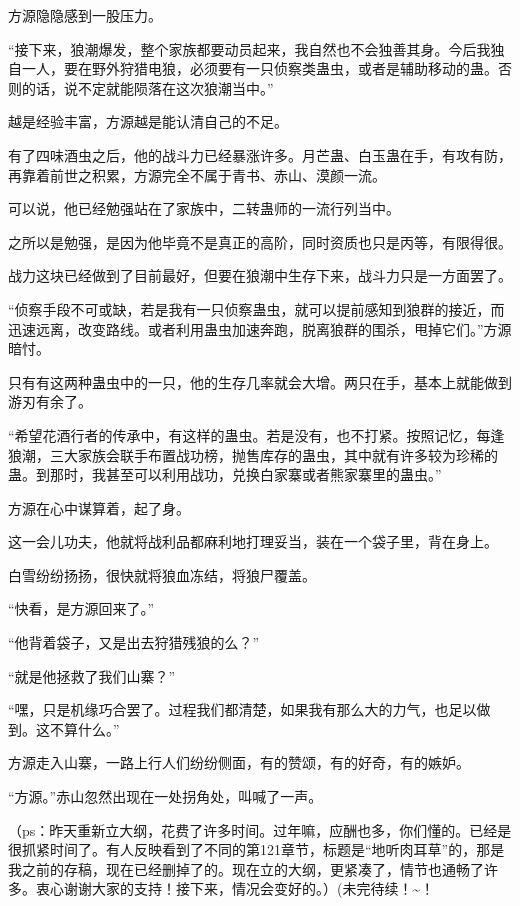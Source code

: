 \begin{this_body}
方源隐隐感到一股压力。

“接下来，狼潮爆发，整个家族都要动员起来，我自然也不会独善其身。今后我独自一人，要在野外狩猎电狼，必须要有一只侦察类蛊虫，或者是辅助移动的蛊。否则的话，说不定就能陨落在这次狼潮当中。”

越是经验丰富，方源越是能认清自己的不足。

有了四味酒虫之后，他的战斗力已经暴涨许多。月芒蛊、白玉蛊在手，有攻有防，再靠着前世之积累，方源完全不属于青书、赤山、漠颜一流。

可以说，他已经勉强站在了家族中，二转蛊师的一流行列当中。

之所以是勉强，是因为他毕竟不是真正的高阶，同时资质也只是丙等，有限得很。

战力这块已经做到了目前最好，但要在狼潮中生存下来，战斗力只是一方面罢了。

“侦察手段不可或缺，若是我有一只侦察蛊虫，就可以提前感知到狼群的接近，而迅速远离，改变路线。或者利用蛊虫加速奔跑，脱离狼群的围杀，甩掉它们。”方源暗忖。

只有有这两种蛊虫中的一只，他的生存几率就会大增。两只在手，基本上就能做到游刃有余了。

“希望花酒行者的传承中，有这样的蛊虫。若是没有，也不打紧。按照记忆，每逢狼潮，三大家族会联手布置战功榜，抛售库存的蛊虫，其中就有许多较为珍稀的蛊。到那时，我甚至可以利用战功，兑换白家寨或者熊家寨里的蛊虫。”

方源在心中谋算着，起了身。

这一会儿功夫，他就将战利品都麻利地打理妥当，装在一个袋子里，背在身上。

白雪纷纷扬扬，很快就将狼血冻结，将狼尸覆盖。

“快看，是方源回来了。”

“他背着袋子，又是出去狩猎残狼的么？”

“就是他拯救了我们山寨？”

“嘿，只是机缘巧合罢了。过程我们都清楚，如果我有那么大的力气，也足以做到。这不算什么。”

方源走入山寨，一路上行人们纷纷侧面，有的赞颂，有的好奇，有的嫉妒。

“方源。”赤山忽然出现在一处拐角处，叫喊了一声。

（ps：昨天重新立大纲，花费了许多时间。过年嘛，应酬也多，你们懂的。已经是很抓紧时间了。有人反映看到了不同的第121章节，标题是“地听肉耳草”的，那是我之前的存稿，现在已经删掉了的。现在立的大纲，更紧凑了，情节也通畅了许多。衷心谢谢大家的支持！接下来，情况会变好的。）(未完待续！\~{}！

\end{this_body}

